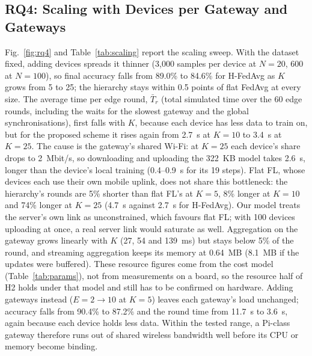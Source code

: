 \documentclass[conference]{IEEEtran}
\begin{document}
\begin{table}[t]
\centering
\caption{Deadline sensitivity of the proposed scheme ($E = 4$, $K = 5$, mixed tiers; mean over three seeds). $q$: deadline quantile of the devices' expected full-epoch time; $T_{\mathrm{tgt}}$ in simulated seconds.}
\label{tab:deadline}
\footnotesize

\end{table}

\subsection{RQ4: Scaling with Devices per Gateway and Gateways}
Fig.~\ref{fig:rq4} and Table~\ref{tab:scaling} report the scaling sweep. With the dataset fixed, adding devices spreads it thinner (3{,}000 samples per device at $N = 20$, 600 at $N = 100$), so final accuracy falls from 89.0\% to 84.6\% for H-FedAvg as $K$ grows from 5 to 25; the hierarchy stays within 0.5 points of flat FedAvg at every size. The average time per edge round, $\bar T_r$ (total simulated time over the 60 edge rounds, including the waits for the slowest gateway and the global synchronisations), first falls with $K$, because each device has less data to train on, but for the proposed scheme it rises again from 2.7~s at $K = 10$ to 3.4~s at $K = 25$. The cause is the gateway's shared Wi-Fi: at $K = 25$ each device's share drops to 2~Mbit/s, so downloading and uploading the 322~KB model takes 2.6~s, longer than the device's local training (0.4--0.9~s for its 19 steps). Flat FL, whose devices each use their own mobile uplink, does not share this bottleneck: the hierarchy's rounds are 5\% shorter than flat FL's at $K = 5$, 8\% longer at $K = 10$ and 74\% longer at $K = 25$ (4.7~s against 2.7~s for H-FedAvg). Our model treats the server's own link as unconstrained, which favours flat FL; with 100 devices uploading at once, a real server link would saturate as well. Aggregation on the gateway grows linearly with $K$ (27, 54 and 139~ms) but stays below 5\% of the round, and streaming aggregation keeps its memory at 0.64~MB (8.1~MB if the updates were buffered). These resource figures come from the cost model (Table~\ref{tab:params}), not from measurements on a board, so the resource half of H2 holds under that model and still has to be confirmed on hardware. Adding gateways instead ($E = 2 \rightarrow 10$ at $K = 5$) leaves each gateway's load unchanged; accuracy falls from 90.4\% to 87.2\% and the round time from 11.7~s to 3.6~s, again because each device holds less data. Within the tested range, a Pi-class gateway therefore runs out of shared wireless bandwidth well before its CPU or memory become binding.
\end{document}
